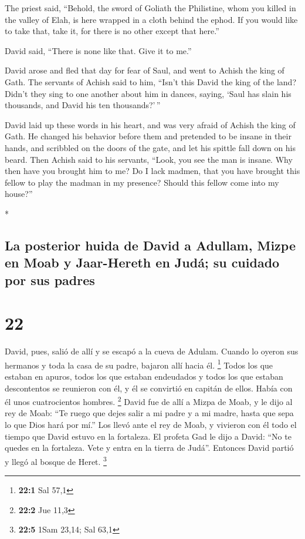 \begin{paracol}{2}
\begin{otherlanguage}{english}
 The priest said, ``Behold, the sword of Goliath the
Philistine, whom you killed in the valley of Elah, is here wrapped in a
cloth behind the ephod. If you would like to take that, take it, for
there is no other except that here.''

David said, ``There is none like that. Give it to me.''

 David arose and fled that day for fear of Saul, and went
to Achish the king of Gath.  The servants of Achish said
to him, ``Isn't this David the king of the land? Didn't they sing to one
another about him in dances, saying, `Saul has slain his thousands, and
David his ten thousands?'\,''

 David laid up these words in his heart, and was very
afraid of Achish the king of Gath.  He changed his
behavior before them and pretended to be insane in their hands, and
scribbled on the doors of the gate, and let his spittle fall down on his
beard.  Then Achish said to his servants, ``Look, you see
the man is insane. Why then have you brought him to me? 
Do I lack madmen, that you have brought this fellow to play the madman
in my presence? Should this fellow come into my house?''

\end{otherlanguage}

\switchcolumn[0]*

\hypertarget{la-posterior-huida-de-david-a-adullam-mizpe-en-moab-y-jaar-hereth-en-juduxe1-su-cuidado-por-sus-padres}{%
\subsection{La posterior huida de David a Adullam, Mizpe en Moab y
Jaar-Hereth en Judá; su cuidado por sus
padres}\label{la-posterior-huida-de-david-a-adullam-mizpe-en-moab-y-jaar-hereth-en-juduxe1-su-cuidado-por-sus-padres}}

\hypertarget{section-42}{%
\section{22}\label{section-42}}

 David, pues, salió de allí y se escapó a la cueva de
Adulam. Cuando lo oyeron sus hermanos y toda la casa de su padre,
bajaron allí hacia él. \footnote{\textbf{22:1} Sal 57,1} 
Todos los que estaban en apuros, todos los que estaban endeudados y
todos los que estaban descontentos se reunieron con él, y él se
convirtió en capitán de ellos. Había con él unos cuatrocientos hombres.
\footnote{\textbf{22:2} Jue 11,3}  David fue de allí a
Mizpa de Moab, y le dijo al rey de Moab: ``Te ruego que dejes salir a mi
padre y a mi madre, hasta que sepa lo que Dios hará por mí.''
 Los llevó ante el rey de Moab, y vivieron con él todo el
tiempo que David estuvo en la fortaleza.  El profeta Gad
le dijo a David: ``No te quedes en la fortaleza. Vete y entra en la
tierra de Judá''. Entonces David partió y llegó al bosque de Heret.
\footnote{\textbf{22:5} 1Sam 23,14; Sal 63,1}


\end{paracol}
